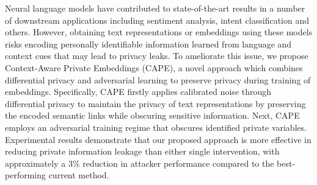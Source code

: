 Neural language models have contributed to state-of-the-art results in a number of downstream applications including sentiment analysis, intent classification and others. However, obtaining text representations or embeddings using these models risks encoding personally identifiable information learned from language and context cues that may lead to privacy leaks. To ameliorate this issue, we propose Context-Aware Private Embeddings (CAPE), a novel approach which combines differential privacy and adversarial learning to preserve privacy during training of embeddings. Specifically, CAPE firstly applies calibrated noise through differential privacy to maintain the privacy of text representations by preserving the encoded semantic links while obscuring sensitive information. Next, CAPE employs an adversarial training regime that obscures identified private variables. Experimental results demonstrate that our proposed approach is more effective in reducing private information leakage than either single intervention, with approximately a 3\% reduction in attacker performance compared to the best-performing current method.
